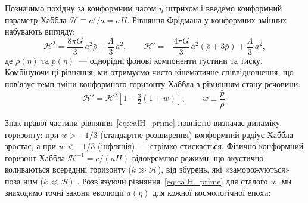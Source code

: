Позначимо похідну за конформним часом $\eta$ штрихом і введемо конформний параметр Хаббла $\mathcal{H} \equiv a'/a = aH$. Рівняння Фрідмана у конформних змінних набувають вигляду:
\begin{equation*}
  \mathcal{H}^2 = \frac{8\pi G}{3}\,a^2\bar{\rho} + \frac{\Lambda}{3}\,a^2,
  \qquad
  \mathcal{H}' = -\frac{4\pi G}{3}\,a^2(\bar{\rho} + 3\bar{p}) + \frac{\Lambda}{3}\,a^2,
\end{equation*}
де $\bar{\rho}(\eta)$ та $\bar{p}(\eta)$~--- однорідні фонові компоненти густини та тиску. Комбінуючи ці рівняння, ми отримуємо чисто кінематичне співвідношення, що пов'язує темп зміни конформного горизонту Хаббла з рівнянням стану речовини:
\begin{equation}\label{eq:calH_prime}
  \mathcal{H}' = \mathcal{H}^2\!\left[1 - \tfrac{3}{2}(1+w)\right], \qquad w \equiv \frac{\bar{p}}{\bar{\rho}}.
\end{equation}

Знак правої частини рівняння~\eqref{eq:calH_prime} повністю визначає динаміку горизонту: при $w > -1/3$ (стандартне розширення) конформний радіус Хаббла зростає, а при $w < -1/3$ (інфляція)~--- стрімко стискається. Фізично конформний горизонт Хаббла $\mathcal{H}^{-1} = c/(aH)$ відокремлює режими, що акустично коливаються всередині горизонту ($k \gg \mathcal{H}$), від збурень, які «заморожуються» поза ним ($k \ll \mathcal{H}$)~\cite{Baumann2022}. Розв'язуючи рівняння~\eqref{eq:calH_prime} для сталого $w$, ми знаходимо точні закони еволюції $a(\eta)$ для кожної космологічної епохи:

